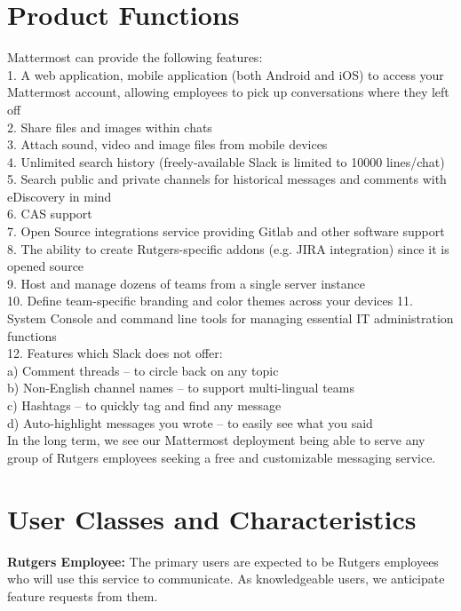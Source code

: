\documentclass{scrreprt}
\newcommand\tab[1][0.5cm]{\hspace*{#1}}
\begin{document}
\section{Product Functions}
Mattermost can provide the following features:\\
\tab 1. A web application, mobile application (both Android and iOS) to access your Mattermost
account, allowing \tab employees to pick up conversations where they left off\\
\tab 2. Share files and images within chats\\
\tab 3. Attach sound, video and image files from mobile devices\\
\tab 4. Unlimited search history (freely-available Slack is limited to 10000 lines/chat)\\
\tab 5. Search public and private channels for historical messages and
comments with eDiscovery in mind\\
\tab 6. CAS support\\
\tab 7. Open Source integrations service providing Gitlab and other software
support\\
\tab 8. The ability to create Rutgers-specific addons (e.g. JIRA integration) since
it is \tab opened source\\
\tab 9. Host and manage dozens of teams from a single server instance\\
\tab 10. Define team-specific branding and color themes across your devices
\tab 11. System Console and command line tools for managing essential IT
administration \tab functions\\
\tab 12. Features which Slack does not offer:\\
\tab\tab a) Comment threads – to circle back on any topic\\
\tab\tab b) Non-English channel names – to support multi-lingual teams\\
\tab\tab c) Hashtags – to quickly tag and find any message\\
\tab\tab d) Auto-highlight messages you wrote – to easily see what you said\\

In the long term, we see our Mattermost deployment being able to serve any group
of Rutgers employees seeking a free and customizable messaging service.

\section{User Classes and Characteristics}
\textbf{Rutgers Employee:}
\tab The primary users are expected to be Rutgers employees who will
use this service to communicate.  As knowledgeable users, we
anticipate feature requests from them.\\
\end{document}
